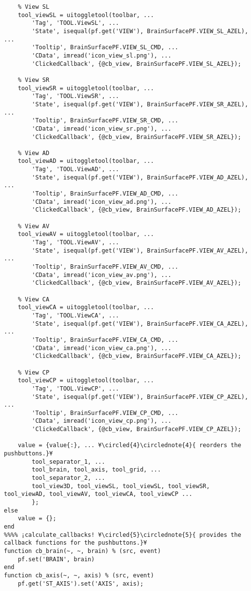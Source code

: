 \documentclass{tufte-handout}
\begin{document}
\begin{lstlisting}
    % View SL
    tool_viewSL = uitoggletool(toolbar, ...
        'Tag', 'TOOL.ViewSL', ...
        'State', isequal(pf.get('VIEW'), BrainSurfacePF.VIEW_SL_AZEL), ...
        'Tooltip', BrainSurfacePF.VIEW_SL_CMD, ...
        'CData', imread('icon_view_sl.png'), ...
        'ClickedCallback', {@cb_view, BrainSurfacePF.VIEW_SL_AZEL});

    % View SR
    tool_viewSR = uitoggletool(toolbar, ...
        'Tag', 'TOOL.ViewSR', ...
        'State', isequal(pf.get('VIEW'), BrainSurfacePF.VIEW_SR_AZEL), ...
        'Tooltip', BrainSurfacePF.VIEW_SR_CMD, ...
        'CData', imread('icon_view_sr.png'), ...
        'ClickedCallback', {@cb_view, BrainSurfacePF.VIEW_SR_AZEL});

    % View AD
    tool_viewAD = uitoggletool(toolbar, ...
        'Tag', 'TOOL.ViewAD', ...
        'State', isequal(pf.get('VIEW'), BrainSurfacePF.VIEW_AD_AZEL), ...
        'Tooltip', BrainSurfacePF.VIEW_AD_CMD, ...
        'CData', imread('icon_view_ad.png'), ...
        'ClickedCallback', {@cb_view, BrainSurfacePF.VIEW_AD_AZEL});

    % View AV
    tool_viewAV = uitoggletool(toolbar, ...
        'Tag', 'TOOL.ViewAV', ...
        'State', isequal(pf.get('VIEW'), BrainSurfacePF.VIEW_AV_AZEL), ...
        'Tooltip', BrainSurfacePF.VIEW_AV_CMD, ...
        'CData', imread('icon_view_av.png'), ...
        'ClickedCallback', {@cb_view, BrainSurfacePF.VIEW_AV_AZEL});

    % View CA
    tool_viewCA = uitoggletool(toolbar, ...
        'Tag', 'TOOL.ViewCA', ...
        'State', isequal(pf.get('VIEW'), BrainSurfacePF.VIEW_CA_AZEL), ...
        'Tooltip', BrainSurfacePF.VIEW_CA_CMD, ...
        'CData', imread('icon_view_ca.png'), ...
        'ClickedCallback', {@cb_view, BrainSurfacePF.VIEW_CA_AZEL});

    % View CP
    tool_viewCP = uitoggletool(toolbar, ...
        'Tag', 'TOOL.ViewCP', ...
        'State', isequal(pf.get('VIEW'), BrainSurfacePF.VIEW_CP_AZEL), ...
        'Tooltip', BrainSurfacePF.VIEW_CP_CMD, ...
        'CData', imread('icon_view_cp.png'), ...
        'ClickedCallback', {@cb_view, BrainSurfacePF.VIEW_CP_AZEL});
    
    value = {value{:}, ... ¥\circled{4}\circlednote{4}{ reorders the pushbuttons.}¥
        tool_separator_1, ...
        tool_brain, tool_axis, tool_grid, ...
        tool_separator_2, ...
        tool_view3D, tool_viewSL, tool_viewSL, tool_viewSR, tool_viewAD, tool_viewAV, tool_viewCA, tool_viewCP ...
        };
else
    value = {};
end
%%%% ¡calculate_callbacks! ¥\circled{5}\circlednote{5}{ provides the callback functions for the pushbuttons.}¥
function cb_brain(~, ~, brain) % (src, event)
    pf.set('BRAIN', brain)
end
function cb_axis(~, ~, axis) % (src, event)
    pf.get('ST_AXIS').set('AXIS', axis);
    

\end{lstlisting}
\end{document}
